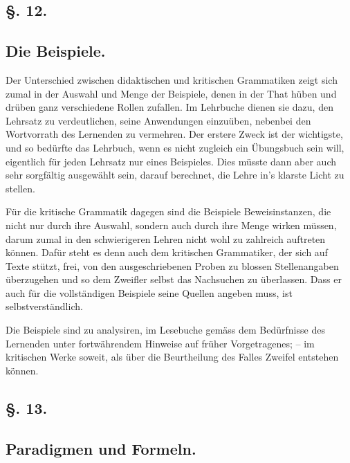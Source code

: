 \subsection*{§. 12.}\label{II.VI.12}
\subsection*{Die Beispiele.}

Der Unterschied zwischen didaktischen und kritischen Grammatiken zeigt sich zumal in der Auswahl und Menge der Beispiele, denen in der That hüben und drüben ganz verschiedene Rollen zufallen. Im Lehrbuche dienen sie dazu, den Lehrsatz zu verdeutlichen, seine Anwendungen einzuüben, nebenbei den Wortvorrath des Lernenden zu vermehren. Der erstere Zweck ist der wichtigste, und so bedürfte das Lehrbuch, wenn es nicht zugleich ein Übungsbuch sein will, eigentlich für jeden Lehrsatz nur eines Beispieles. Dies müsste dann aber auch sehr sorgfältig ausgewählt sein, darauf berechnet, die Lehre in’s klarste Licht zu stellen.

Für die kritische Grammatik dagegen sind die Beispiele Beweisinstanzen, die nicht nur durch ihre Auswahl, sondern auch durch ihre Menge wirken müssen, darum zumal in den schwierigeren Lehren nicht wohl zu zahlreich auftreten können. Dafür steht es denn auch dem kritischen Grammatiker, der sich auf Texte stützt, frei, von den ausgeschriebenen Proben zu blossen Stellenangaben überzugehen und so dem Zweifler selbst das Nachsuchen zu überlassen. Dass er auch für die vollständigen Beispiele seine Quellen angeben muss, ist selbstverständlich.

Die Beispiele sind zu analysiren, im Lesebuche gemäss dem Bedürf\label{fp.123}nisse des Lernenden unter fortwährendem Hinweise auf früher Vorgetragenes; – im kritischen Werke soweit, als über die Beurtheilung des Falles Zweifel entstehen können.

\subsection*{§. 13.}\label{II.VI.13}
\subsection*{Paradigmen und Formeln.}

